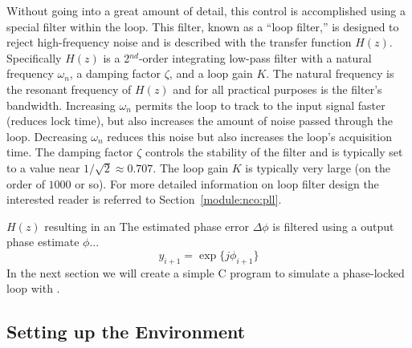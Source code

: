 Without going into a great amount of detail, this control is
accomplished using a special filter within the loop.
This filter, known as a ``loop filter,'' is designed to reject
high-frequency noise and is described with the transfer function $H(z)$.
Specifically $H(z)$ is a 2$^{nd}$-order integrating low-pass filter
with
a natural frequency $\omega_n$,
a damping factor $\zeta$, and
a loop gain $K$.
The natural frequency is the resonant frequency of $H(z)$ and for all
practical purposes is the filter's bandwidth.
Increasing $\omega_n$ permits the loop to track to the input signal
faster (reduces lock time), but also increases the amount of noise
passed through the loop.
Decreasing $\omega_n$ reduces this noise but also increases the loop's
acquisition time.
The damping factor $\zeta$ controls the stability of the filter and is
typically set to a value near $1/\sqrt{2} \approx 0.707$.
The loop gain $K$ is typically very large
(on the order of $1000$ or so).
For more detailed information on loop filter design the interested
reader is referred to Section~\ref{module:nco:pll}.


$H(z)$ resulting in an
The estimated phase error $\Delta\phi$ is filtered using a
output phase estimate $\phi$...
%
\begin{equation}
\label{eqn:tutoral:pll:y1}
    y_{i+1} = \exp\bigl\{ j\phi_{i+1} \bigr\}
\end{equation}
%
%
%
%
%
In the next section we will create a simple C program to simulate a
phase-locked loop with \liquid.


\subsection{Setting up the Environment}
\label{tutorial:pll:environment}

